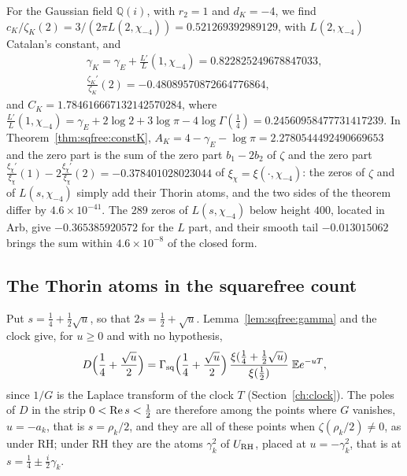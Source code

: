 For the Gaussian field $\mathbb Q(i)$, with $r_2=1$ and $d_K=-4$, we find $c_K/\zeta_K(2)=3/(2\pi L(2,\chi_{-4}))=0.521269392989129$, with $L(2,\chi_{-4})$ Catalan's constant, and
\begin{gather*}
\gamma_K=\gamma_E+\frac{L'}L(1,\chi_{-4})=0.822825249678847033,\\
\frac{\zeta_K'}{\zeta_K}(2)=-0.48089570872664776864,
\end{gather*}
and $C_K=1.784616667132142570284$, where $\frac{L'}L(1,\chi_{-4})=\gamma_E+2\log2+3\log\pi-4\log\Gamma(\frac14)=0.24560958477731417239$. In Theorem~\ref{thm:sqfree:constK}, $A_K=4-\gamma_E-\log\pi=2.2780544492490669653$ and the zero part is the sum of the zero part $b_1-2b_2$ of $\zeta$ and the zero part $\frac{\xi_\chi'}{\xi_\chi}(1)-2\frac{\xi_\chi'}{\xi_\chi}(2)=-0.378401028023044$ of $\xi_\chi=\xi(\cdot,\chi_{-4})$: the zeros of $\zeta$ and of $L(s,\chi_{-4})$ simply add their Thorin atoms, and the two sides of the theorem differ by $4.6\times10^{-41}$. The $289$ zeros of $L(s,\chi_{-4})$ below height $400$, located in Arb, give $-0.365385920572$ for the $L$ part, and their smooth tail $-0.013015062$ brings the sum within $4.6\times10^{-8}$ of the closed form.

\subsection{The Thorin atoms in the squarefree count}\label{sec:sqfree:atoms}

Put $s=\frac14+\frac12\sqrt u$, so that $2s=\frac12+\sqrt u$. Lemma~\ref{lem:sqfree:gamma} and the clock give, for $u\ge0$ and with no hypothesis,
\[
D\Big(\frac14+\frac{\sqrt u}2\Big)=\Gamma_{\mathrm{sq}}\Big(\frac14+\frac{\sqrt u}2\Big)\,\frac{\xi(\frac14+\frac12\sqrt u)}{\xi(\frac12)}\;\mathbb{E} e^{-uT},
\]
since $1/G$ is the Laplace transform of the clock $T$ (Section~\ref{ch:clock}). The poles of $D$ in the strip $0<\operatorname{Re} s<\frac12$ are therefore among the points where $G$ vanishes, $u=-a_k$, that is $s=\rho_k/2$, and they are all of these points when $\zeta(\rho_k/2)\ne0$, as under RH; under RH they are the atoms $\gamma_k^2$ of $U_{\mathrm{RH}}$, placed at $u=-\gamma_k^2$, that is at $s=\frac14\pm\frac i2\gamma_k$.

